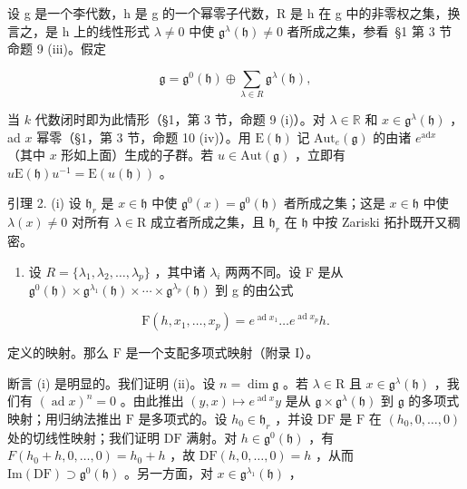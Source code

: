 设 g 是一个李代数，h 是 g 的一个幂零子代数，R 是 h 在 g 中的非零权之集，换言之，是 h 上的线性形式 \(\lambda \neq 0\) 中使 \(\mathfrak{g}^{\lambda}(\mathfrak{h}) \neq 0\) 者所成之集，参看~§1 第 3 节命题 9 (iii)。假定

\[
\mathfrak {g} = \mathfrak {g} ^ {0} (\mathfrak {h}) \oplus \sum_ {\lambda \in R} \mathfrak {g} ^ {\lambda} (\mathfrak {h}),
\]

当 \(k\) 代数闭时即为此情形（§1，第 3 节，命题 9 (i)）。对 \(\lambda \in \mathbb{R}\) 和 \(x \in \mathfrak{g}^{\lambda}(\mathfrak{h})\) ，ad \(x\) 幂零（§1，第 3 节，命题 10 (iv)）。用 \(\mathrm{E}(\mathfrak{h})\) 记 \(\mathrm{Aut}_e(\mathfrak{g})\) 的由诸 \(e^{\mathrm{ad}x}\) （其中 \(x\) 形如上面）生成的子群。若 \(u \in \mathrm{Aut}(\mathfrak{g})\) ，立即有 \(u\mathrm{E}(\mathfrak{h})u^{-1} = \mathrm{E}(u(\mathfrak{h}))\) 。

引理 2. (i) 设 \(\mathfrak{h}_r\) 是 \(x\in \mathfrak{h}\) 中使 \(\mathfrak{g}^0 (x) = \mathfrak{g}^0 (\mathfrak{h})\) 者所成之集；这是 \(x\in \mathfrak{h}\) 中使 \(\lambda (x)\neq 0\) 对所有 \(\lambda \in \mathrm{R}\) 成立者所成之集，且 \(\mathfrak{h}_r\) 在 \(\mathfrak{h}\) 中按 Zariski 拓扑既开又稠密。

\begin{enumerate}
\def\labelenumi{(\roman{enumi})}
\setcounter{enumi}{1}
\tightlist
\item
  设 \(R = \{\lambda_{1}, \lambda_{2}, \ldots, \lambda_{p}\}\) ，其中诸 \(\lambda_{i}\) 两两不同。设 F 是从 \(\mathfrak{g}^{0}(\mathfrak{h}) \times \mathfrak{g}^{\lambda_{1}}(\mathfrak{h}) \times \cdots \times \mathfrak{g}^{\lambda_{p}}(\mathfrak{h})\) 到 g 的由公式
\end{enumerate}

\[
\mathrm{F} (h, x _ {1}, \dots , x _ {p}) = e ^ {\operatorname{ad} x _ {1}} \dots e ^ {\operatorname{ad} x _ {p}} h.
\]

定义的映射。那么 \(\mathrm{F}\) 是一个支配多项式映射（附录 I）。

断言 (i) 是明显的。我们证明 (ii)。设 \(n = \dim \mathfrak{g}\) 。若 \(\lambda \in \mathrm{R}\) 且 \(x \in \mathfrak{g}^{\lambda}(\mathfrak{h})\) ，我们有 \((\operatorname{ad} x)^n = 0\) 。由此推出 \((y, x) \mapsto e^{\operatorname{ad} x} y\) 是从 \(\mathfrak{g} \times \mathfrak{g}^{\lambda}(\mathfrak{h})\) 到 \(\mathfrak{g}\) 的多项式映射；用归纳法推出 \(\mathrm{F}\) 是多项式的。设 \(h_0 \in \mathfrak{h}_r\) ，并设 \(\mathrm{DF}\) 是 \(\mathrm{F}\) 在 \((h_0, 0, \ldots, 0)\) 处的切线性映射；我们证明 \(\mathrm{DF}\) 满射。对 \(h \in \mathfrak{g}^{0}(\mathfrak{h})\) ，有 \(F(h_{0} + h, 0, \ldots, 0) = h_{0} + h\) ，故 \(\mathrm{DF}(h, 0, \ldots, 0) = h\) ，从而 \(\mathrm{Im}(\mathrm{DF}) \supset \mathfrak{g}^{0}(\mathfrak{h})\) 。另一方面，对 \(x \in \mathfrak{g}^{\lambda_{1}}(\mathfrak{h})\) ，

